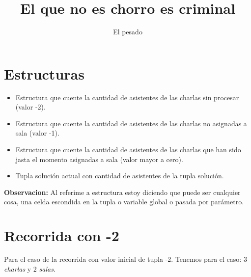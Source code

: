 \documentclass[11pt]{article}
\title{\textbf{El que no es chorro es criminal}}
\author{El pesado}
\date{}
\begin{document}
\maketitle
\newpage
\tableofcontents
\newpage
\section{Estructuras}
\begin{itemize}
\item  Estructura que cuente la cantidad de asistentes de las charlas sin procesar  (valor -2).
\end{itemize}

\begin{itemize}
\item  Estructura que cuente la cantidad de asistentes de las charlas no asignadas a sala (valor -1).
\end{itemize}

\begin{itemize}
\item  Estructura que cuente la cantidad de asistentes de las charlas que han sido jasta el momento asignadas a sala (valor mayor a cero).
\end{itemize}

\begin{itemize}
\item  Tupla solución actual con cantidad de asistentes de la tupla solución.
\end{itemize}


\textbf{Observacion:} Al referime a estructura estoy diciendo que puede ser cualquier cosa, una celda escondida en la tupla o variable global o pasada por parámetro.

\newpage
\section{Recorrida con -2}
Para el caso de la recorrida con valor inicial de tupla -2. 
Tenemos para el caso: 3 \textit{charlas} y 2 \textit{salas}.

\begin{center}
\end{center}
\end{document}
